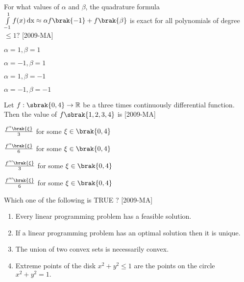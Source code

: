 \item For what values of $\alpha$ and $\beta$, the quadrature formula $\int \limits_{-1}^1 f(x)\, \text{dx} \approx \alpha f\brak{-1}+f\brak{\beta}$ is exact for all polynomials of degree $\leq 1 ?$ \hfill{[2009-MA]}
\begin{enumerate}
\begin{multicols}{4}
\item $\alpha=1, \beta=1$
\item $\alpha=-1, \beta=1$
\item $\alpha=1, \beta=-1$
\item $\alpha=-1, \beta=-1$
\end{multicols}
\end{enumerate}

\item Let $f:\sbrak{0,4} \rightarrow \mathbb R$ be a three times continuously differential function. Then the value of $f\sbrak{1,2,3,4}$ is \hfill{[2009-MA]}
\begin{enumerate}
\begin{multicols}{2}
\item $\frac{f''\brak{\xi}}{3}$ for some $\xi \in \brak{0,4}$
\item $\frac{f''\brak{\xi}}{6}$ for some $\xi \in \brak{0,4}$
\item $\frac{f'''\brak{\xi}}{3}$ for some $\xi \in \brak{0,4}$
\item $\frac{f'''\brak{\xi}}{6}$ for some $\xi \in \brak{0,4}$
\end{multicols}
\end{enumerate}

\item Which one of the following is TRUE ? \hfill{[2009-MA]}

\begin{enumerate}
    \item Every linear programming problem has a feasible solution.
    \item If a linear programming problem has an optimal solution then it is unique.
    \item The union of two convex sets is necessarily convex.
    \item Extreme points of the disk $x^2+y^2 \leq 1$ are the points on the circle $x^2+y^2=1.$
\end{enumerate}

